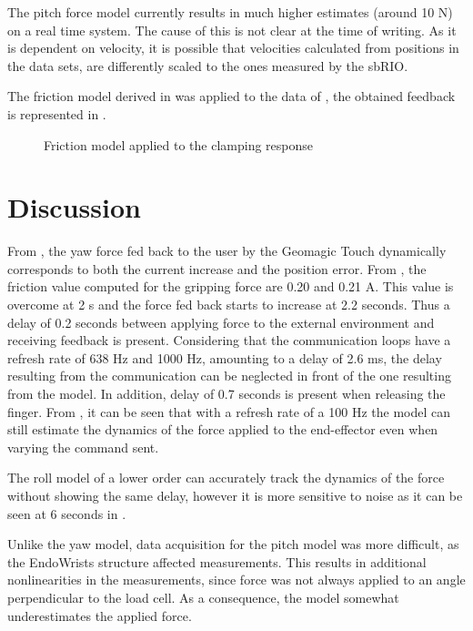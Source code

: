 The pitch force model currently results in much higher estimates (around 10 N) on a real time system. The cause of this is not clear at the time of writing. As it is dependent on velocity, it is possible that velocities calculated from positions in the data sets, are differently scaled to the ones measured by the sbRIO.


The friction model derived in  was applied to the data of , the obtained feedback is represented in .
\begin{figure}[H]

\caption{Friction model applied to the clamping response}
\label{fig:friction_validation}
\end{figure}


\section{Discussion}



From , the yaw force fed back to the user by the Geomagic Touch dynamically corresponds to both the current increase and the position error. From , the friction value computed for the gripping force are 0.20 and 0.21 A. This value is overcome at 2 s and the force fed back starts to increase at 2.2 seconds. Thus a delay of 0.2 seconds between applying force to the external environment and receiving feedback is present. Considering that the communication loops have a refresh rate of 638 Hz and 1000 Hz, amounting to a delay of 2.6 ms, the delay resulting from the communication can be neglected in front of the one resulting from the model. In addition, delay of 0.7 seconds is present when releasing the finger.
From , it can be seen that with a refresh rate of a 100 Hz the model can still estimate the dynamics of the force applied to the end-effector even when varying the command sent.

The roll model of a lower order can accurately track the dynamics of the force without showing the same delay, however it is more sensitive to noise as it can be seen at 6 seconds in .


Unlike the yaw model, data acquisition for the pitch model was more difficult, as the EndoWrists structure affected measurements.
This results in additional nonlinearities in the measurements, since force was not always applied to an angle perpendicular to the load cell.
As a consequence, the model somewhat underestimates the applied force.

